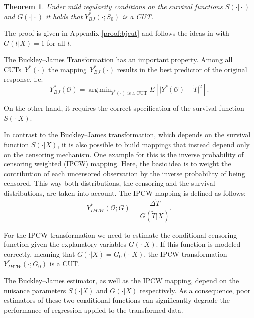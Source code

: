 \documentclass[12pt, a4paper]{scrartcl}
\theoremstyle{definition}
\theoremstyle{plain}
\newtheorem{Theorem}{Theorem}[section]
\numberwithin{equation}{section}
\numberwithin{figure}{section}
\numberwithin{table}{section}
\DeclareMathOperator*{\argmin}{arg\,min}
\begin{document}
	\begin{Theorem}\label{thm:bj}
		Under mild regularity conditions on the survival functions $S(\cdot\vert\cdot)$ and $G(\cdot\vert\cdot)$ it holds that $Y_{BJ}^*(\cdot; S_0)$ is a CUT.
	\end{Theorem}
	
	The proof is given in Appendix \ref{proof:bjcut} and follows the ideas in \citet*{drcut} with $G(t\vert X)=1$ for all $t$.
	
	The Buckley--James Transformation has an important property.
	Among all CUTs~$Y^*(\cdot)$ the mapping~$Y_{BJ}^* (\cdot)$ results in the best predictor of the original response, i.e.
	\begin{equation*}
	Y_{BJ}^* (\mathcal{O})= \argmin_{\text{$Y^*(\cdot)$~is~a~CUT}} E[ \vert Y^*(\mathcal{O}) - \tilde T \vert ^2].
	\end{equation*}
	
	On the other hand, it requires the correct specification of the survival function~$S(\cdot\vert X)$.

	In contrast to the Buckley--James transformation, which depends on the survival function $S(\cdot\vert X)$, it is also possible to build mappings that instead depend only on the censoring mechanism.
	One example for this is the inverse probability of censoring weighted (IPCW) mapping.
	Here, the basic idea is to weight the contribution of each uncensored observation by the inverse probability of being censored.
	This way both distributions, the censoring and the survival distributions, are taken into account.
	The IPCW mapping is defined as follows:
	\begin{equation*}
	Y_{IPCW}^*(\mathcal{O}; G) = \frac{\Delta \tilde T}{G(\tilde T \vert X)}.
	\end{equation*}

	For the IPCW transformation we need to estimate the conditional censoring function given the explanatory variables $G(\cdot\vert X)$.
	If this function is modeled correctly, meaning that $G(\cdot\vert X)=G_0(\cdot\vert X)$, the IPCW transformation $Y_{IPCW}^*(\cdot; G_0)$ is a CUT.
	
	
	

	The Buckley--James estimator, as well as the IPCW mapping, depend on the nuisance parameters $S(\cdot\vert X)$ and $G(\cdot\vert X)$ respectively.
	As a consequence, poor estimators of these two conditional functions can significantly degrade the performance of regression applied to the transformed data.
	
\end{document}
